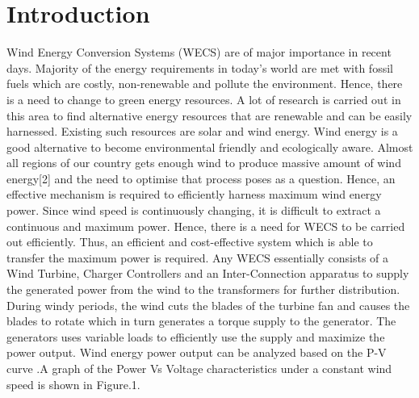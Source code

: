 \section{Introduction}
\label{intro}
Wind Energy Conversion Systems (WECS) are of major importance in recent days\cite{RefJ1}. Majority of the energy requirements in today’s world are met with fossil fuels which are costly, non-renewable and pollute the environment. Hence, there is a need to change to green energy resources. A lot of research is carried out in this area to find alternative energy resources that are renewable and can be easily harnessed. Existing such resources are solar and wind energy. Wind energy is a good alternative to become environmental friendly and ecologically aware. Almost all regions of our country gets enough wind to produce massive amount of wind energy[2] and the need to optimise that process poses as a question.
Hence, an effective mechanism is required to efficiently harness maximum wind energy power. Since wind speed is continuously changing, it is difficult to extract a continuous and maximum power. Hence, there is a need for WECS to be carried out efficiently. Thus, an efficient and cost-effective system which is able to transfer the maximum power is required. Any WECS essentially consists of a Wind Turbine, Charger Controllers and an Inter-Connection apparatus to supply the generated power from the wind to the transformers for further distribution. During windy periods, the wind cuts the blades of the turbine fan and causes the blades to rotate which in turn generates a torque supply to the generator. The generators uses variable loads to efficiently use the supply and maximize the power output. Wind energy power output can be analyzed based on the P-V curve .A graph of the Power Vs Voltage characteristics under a constant wind speed is shown in Figure.1.
